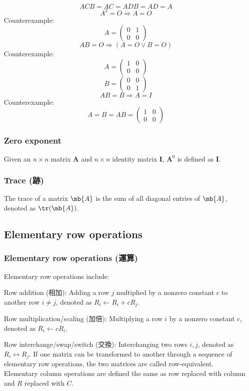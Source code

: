 \documentclass[a4paper,12pt]{report}
\begin{document}
\[ACB=AC=ADB=AD=A\]
\epr
\[A^2=O\Rightarrow A=O\]
\bpr
Counterexample:
\[A=\begin{pmatrix}0&1\\0&0\end{pmatrix}\]
\epr
\[AB=O\Rightarrow(A=O\lor B=O)\]
\bpr
Counterexample:
\[A=\begin{pmatrix}1&0\\0&0\end{pmatrix}\]
\[B=\begin{pmatrix}0&0\\0&1\end{pmatrix}\]
\epr
\[AB=B\Rightarrow A=I\]
\bpr
Counterexample:
\[A=B=AB=\begin{pmatrix}1&0\\0&0\end{pmatrix}\]
\epr
\subsubsection{Zero exponent}
Given an $n\times n$ matrix $\mathbf{A}$ and $n\times n$ identity matrix $\mathbf{I}$, $\mathbf{A}^0$ is defined as $\mathbf{I}$.
\subsubsection{Trace (跡)}
The trace of a matrix $\mb{A}$ is the sum of all diagonal entries of $\mb{A}$, denoted as $\tr(\mb{A})$.
\subsection{Elementary row operations}
\subsubsection{Elementary row operations (運算)}
Elementary row operations include:
\bit
\item Row addition (相加): Adding a row $j$ multiplied by a nonzero constant $c$ to another row $i\ne j$, denoted as $R_i\leftarrow R_i+cR_j$.
\item Row multiplication/scaling (加倍): Multiplying a row $i$ by a nonzero constant $c$, denoted as $R_i\leftarrow cR_i$.
\item Row interchange/swap/switch (交換): Interchanging two rows $i,j$, denoted as $R_i\leftrightarrow R_j$.
\eit
If one matrix can be transformed to another through a sequence of elementary row operations, the two matrices are called row-equivalent.
Elementary column operations are defined the same as row replaced with column and $R$ replaced with $C$.
\end{document}
